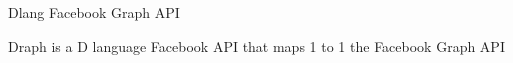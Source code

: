 Dlang Facebook Graph A\+PI

Draph is a D language Facebook A\+PI that maps 1 to 1 the Facebook Graph A\+PI 